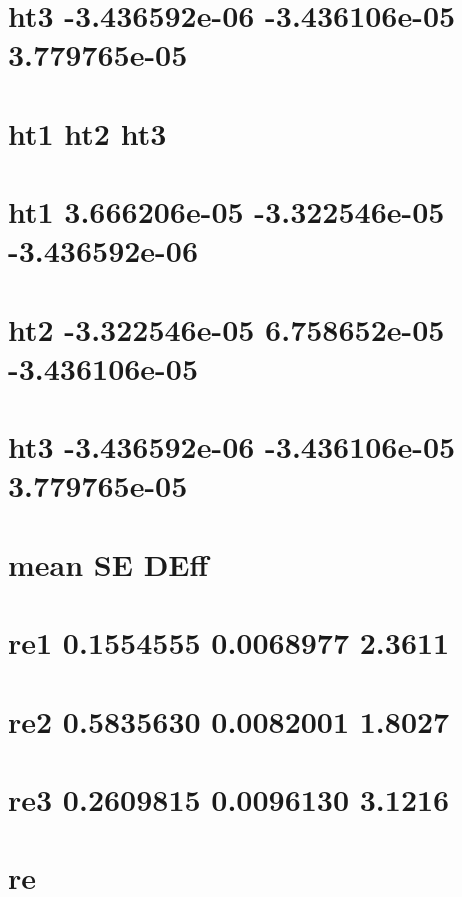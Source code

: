 \documentclass[]{book}
\theoremstyle{definition}
\theoremstyle{definition}
\theoremstyle{definition}
\theoremstyle{remark}
\begin{document}
\section{ht3 -3.436592e-06 -3.436106e-05
3.779765e-05}\label{ht3--3.436592e-06--3.436106e-05-3.779765e-05-1}

\section{ht1 ht2 ht3}\label{ht1-ht2-ht3-4}

\section{ht1 3.666206e-05 -3.322546e-05
-3.436592e-06}\label{ht1-3.666206e-05--3.322546e-05--3.436592e-06-2}

\section{ht2 -3.322546e-05 6.758652e-05
-3.436106e-05}\label{ht2--3.322546e-05-6.758652e-05--3.436106e-05-2}

\section{ht3 -3.436592e-06 -3.436106e-05
3.779765e-05}\label{ht3--3.436592e-06--3.436106e-05-3.779765e-05-2}

\section{mean SE DEff}\label{mean-se-deff}

\section{re1 0.1554555 0.0068977
2.3611}\label{re1-0.1554555-0.0068977-2.3611}

\section{re2 0.5835630 0.0082001
1.8027}\label{re2-0.5835630-0.0082001-1.8027}

\section{re3 0.2609815 0.0096130
3.1216}\label{re3-0.2609815-0.0096130-3.1216}

\section{re}\label{re}
\end{document}
